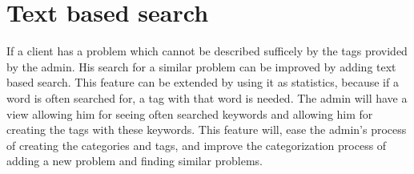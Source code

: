 \section{Text based search}
\label{sec:text_based_search}
If a client has a problem which cannot be described sufficely by the tags provided by the admin. 
His search for a similar problem can be improved by adding text based search. 
This feature can be extended by using it as statistics, because if a word is often searched for, a tag with that word is needed. 
The admin will have a view allowing him for seeing often searched keywords and allowing him for creating the tags with these keywords.
This feature will, ease the admin's process of creating the categories and tags, and improve the categorization process of adding a new problem and finding similar problems. 